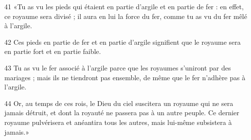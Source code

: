 
41 «Tu as vu les pieds qui étaient en partie d’argile et en partie de fer : en effet, ce royaume sera divisé ; il aura en lui la force du fer, comme tu as vu du fer mêlé à l’argile.

42 Ces pieds en partie de fer et en partie d’argile signifient que le royaume sera en partie fort et en partie faible.

43 Tu as vu le fer associé à l’argile parce que les royaumes s’uniront par des mariages ; mais ils ne tiendront pas ensemble, de même que le fer n’adhère pas à l’argile.

44 Or, au temps de ces rois, le Dieu du ciel suscitera un royaume qui ne sera jamais détruit, et dont la royauté ne passera pas à un autre peuple. Ce dernier royaume pulvérisera et anéantira tous les autres, mais lui-même subsistera à jamais.»